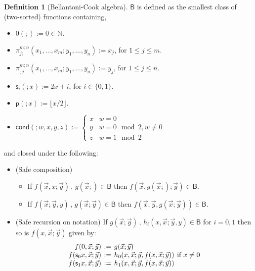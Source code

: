 \documentclass[manuscript,screen]{acmart}
\theoremstyle{definition}
\newtheorem{defn}[thm]{Definition}
\theoremstyle{remark}
\newcommand{\Nat}{\mathbb{N}}
\renewcommand{\succ}[1]{\mathsf{s}_{#1}}
\newcommand{\pred}{\mathsf{p}}
\newcommand{\floor}[1]{\lfloor {#1} \rfloor}
\newcommand{\hlf}[1]{\floor{#1 /2}}
\newcommand{\cnd}{\mathsf{cond}}
\newcommand{\proj}[2]{\pi^{#1}_{#2}}
\newcommand{\bc}{\mathsf{B}}
\begin{document}
\begin{defn}
[Bellantoni-Cook algebra]\label{defn:bc-function-algebra}
$\bc$ is defined as the smallest class of (two-sorted) functions containing,
\begin{itemize}
    \item $0(;) := 0 \in \Nat$.
    \item $\proj {m;n} {j;} (x_1, \dots, x_{m}; y_1, \dots, y_{n}) := x_j$, for $1 \leq j\leq m$.
    \item $\proj {m;n} {;j} (x_1, \dots, x_{m}; y_1, \dots, y_{n}) := y_j$, for $1 \leq j\leq n$.
    \item $\succ i (;x):= 2x+i$, for $i \in \{0,1\}$.
    \item $\pred (;x) := \hlf x$.
    \item $\cnd(;w,x,y,z) := \begin{cases}
    x & w = 0 \\
    y & w = 0 \mod 2, w\neq 0 \\
    z & w = 1 \mod 2
    \end{cases}$
\end{itemize}
and closed under the following:
\begin{itemize}
    \item (Safe composition) 
    \begin{itemize}
        \item If $f(\vec x, x; \vec y)\, ,\, g(\vec x;) \in \bc$ then $f(\vec x, g(\vec x;);\vec y) \in \bc$.
        \item If $f(\vec x; \vec y, y) \, , \, g(\vec x; \vec y) \in \bc$ then $f(\vec x; \vec y, g(\vec x; \vec y)) \in \bc$.
    \end{itemize}
     \item (Safe recursion on notation)
    If $g(\vec x;\vec y) \, , \, h_i (x, \vec x; \vec y, y) \in \bc$ for $i=0,1$ then so is $f(x, \vec x;\vec y) $ given by:
    \[
    \arraycolsep=2pt
    \begin{array}{rcll}
        f(0,\vec x; \vec y) & := & g(\vec x;\vec y) \\
        f(\succ 0 x, \vec x; \vec y) & := & h_0 (x, \vec x; \vec y, f(x, \vec x; \vec y)) & \text{if $x \neq 0$}\\
        f(\succ 1 x, \vec x; \vec y) & := & h_1 (x, \vec x; \vec y, f(x, \vec x; \vec y))
    \end{array}
    \]
\end{itemize}
\end{defn}
\end{document}
